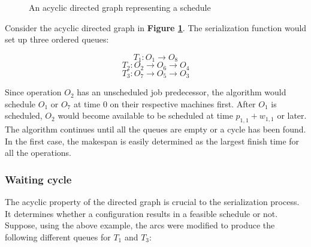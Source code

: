 \documentclass[a4paper,11pt]{article}
\begin{document}
\begin{figure}[h]
\centering
{}
\caption{An acyclic directed graph representing a schedule}
\label{fig:dag}
\end{figure}

Consider the acyclic directed graph in \textbf{Figure \ref{fig:dag}}. The serialization function would set up three ordered queues:

\[ T_1\colon O_1 \rightarrow O_8 \]
\[ T_2\colon O_2 \rightarrow O_6 \rightarrow O_4 \]
\[ T_3\colon O_7 \rightarrow O_5 \rightarrow O_3 \]

Since operation $O_2$ has an unscheduled job predecessor, the algorithm would schedule $O_1$ or $O_7$ at time 0 on their respective machines first. After $O_1$ is scheduled, $O_2$ would become available to be scheduled at time $p_{1,1} + w_{1,1}$ or later. The algorithm continues until all the queues are empty or a cycle has been found. In the first case, the makespan is easily determined as the largest finish time for all the operations.

\subsubsection{Waiting cycle}

The acyclic property of the directed graph is crucial to the serialization process. It determines whether a configuration results in a feasible schedule or not. Suppose, using the above example, the arcs were modified to produce the following different queues for $T_1$ and $T_3$:
\end{document}
